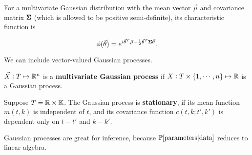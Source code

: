 \begin{remark}
    For a multivariate Gaussian distribution with the mean vector $\vec{\mu}$ and covariance matrix $\pmb{\Sigma}$ (which is allowed to be positive semi-definite), its characteristic function is 
    
    \begin{equation*}
        \phi(\vec{\theta}) = e^{i\vec{\theta}^T \vec{\mu} - \frac{1}{2} \vec{\theta}^T \pmb{\Sigma} \vec{\theta}}.
    \end{equation*}
\end{remark}

We can include vector-valued Gaussian processes.

\begin{definition}
    $\vec{X}:T \mapsto \mathbb{R}^n$ is a \textbf{multivariate Gaussian process} if $X: T \times \{1, \cdots, n\} \mapsto \mathbb{R}$ is a Gaussian process.
\end{definition}

\begin{definition}
    Suppose $T = \mathbb{R} \times \mathbb{K}$. The Gaussian process is \textbf{stationary}, if its mean function $m(t, k)$ is independent of $t$, and its covariance function $c(t, k; t', k')$ is dependent only on $t-t'$ and $k-k'$.
\end{definition}

\begin{remark}
    Gaussian processes are great for inference, because $\mathbb{P} [\text{parameters} | \text{data}]$ reduces to linear algebra.
\end{remark}